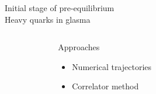 \documentclass[aspectratio=169,11pt,usenames,dvipsnames]{beamer}
\begin{document}

\begin{frame}{}
    \begin{center}
        \vspace{1cm}
        {\large\color{normal}Initial stage of pre-equilibrium}\\[0.3cm]
        {\huge\color{destacado}Heavy quarks in glasma}\\[0.3cm]
        {\large\color{normal}
        \begin{center}
            \begin{columns}
                \begin{column}{0.066\textwidth}\end{column}
                \begin{column}{0.35\textwidth}
                    \centering
                    {\Large\color{ming} Approaches}
                    \begin{itemize}
                        \item Numerical trajectories
                        \item Correlator method
                    \end{itemize}
                \end{column}
                \begin{column}{0.066\textwidth}\end{column}
                \begin{column}{0.45\textwidth}
                    \centering
                    \\[10pt]

\end{column}
\end{columns}
\end{center}}
\end{center}
\end{frame}
\end{document}
